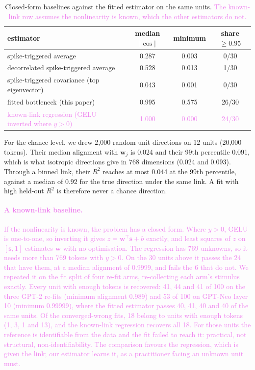 \documentclass[10pt]{article}
\newcommand{\draft}[1]{\textcolor{violet}{#1}}
\begin{document}
\begin{table}[h]
\centering
\small
\begin{tabular}{lccc}
\toprule
estimator & median $|\cos|$ & minimum & share $\ge 0.95$ \\
\midrule
spike-triggered average & 0.287 & 0.003 & 0/30 \\
decorrelated spike-triggered average & 0.528 & 0.013 & 1/30 \\
spike-triggered covariance (top eigenvector) & 0.043 & 0.001 & 0/30 \\
fitted bottleneck (this paper) & 0.995 & 0.575 & 26/30 \\
\draft{known-link regression (GELU inverted where $y>0$)} & \draft{1.000} & \draft{0.000} & \draft{24/30} \\
\bottomrule
\end{tabular}
\caption{Closed-form baselines against the fitted estimator on the same units. \draft{The
known-link row assumes the nonlinearity is known, which the other estimators do not.}}
\label{tab:classical}
\end{table}

For the chance level, we drew 2{,}000 random unit directions on 12 units (20{,}000 tokens).
Their median alignment with $\mathbf{w}_j$ is 0.024 and their 99th percentile 0.091, which is
what isotropic directions give in 768 dimensions (0.024 and 0.093). Through a binned link, their $R^2$ reaches at most
0.044 at the 99th percentile, against a median of 0.92 for the true direction under the same
link. A fit with high held-out $R^2$ is therefore never a chance direction.

\draft{\paragraph{A known-link baseline.} If the nonlinearity is known, the problem has a closed
form. Where $y>0$, GELU is one-to-one, so inverting it gives $z = \mathbf{w}^\top\mathbf{s}+b$
exactly, and least squares of $z$ on $[\mathbf{s}, 1]$ estimates $\mathbf{w}$ with no
optimisation. The regression has 769 unknowns, so it needs more than 769 tokens with $y>0$. On
the 30 units above it passes the 24 that have them, at a median alignment of 0.9999, and fails
the 6 that do not. We repeated it on the fit split of four re-fit arms, re-collecting each arm's
stimulus exactly. Every unit with enough tokens is recovered: 41, 44 and 41 of 100 on the three
GPT-2 re-fits (minimum alignment 0.989) and 53 of 100 on GPT-Neo layer 10 (minimum 0.99999),
where the fitted estimator passes 40, 41, 40 and 40 of the same units. Of the converged-wrong
fits, 18 belong to units with enough tokens (1, 3, 1 and 13), and the known-link regression
recovers all 18. For those units the reference is identifiable from the data and the fit
failed to reach it: practical, not structural, non-identifiability. The comparison favours the
regression, which is given the link; our estimator learns it, as a practitioner facing an
unknown unit must.}
\end{document}
